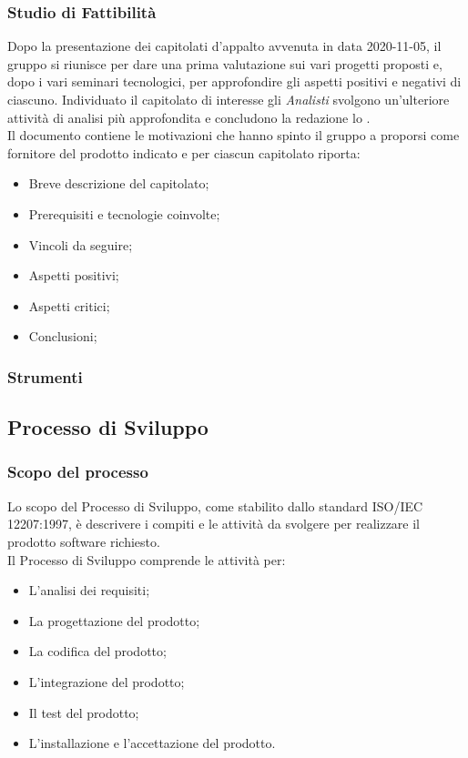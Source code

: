 \subsubsection{Studio di Fattibilità}
Dopo la presentazione dei capitolati d'appalto avvenuta in data 2020-11-05, il gruppo si riunisce per dare una prima valutazione sui vari progetti proposti e, dopo i vari seminari tecnologici, per approfondire gli aspetti positivi e negativi di ciascuno. Individuato il capitolato di interesse gli \textit{Analisti} svolgono un'ulteriore attività di analisi più approfondita e concludono la redazione lo \SdF. \\
Il documento contiene le motivazioni che hanno spinto il gruppo a proporsi come fornitore del prodotto indicato e per ciascun capitolato riporta:
\begin{itemize}
\item Breve descrizione del capitolato;
\item Prerequisiti e tecnologie coinvolte;
\item Vincoli da seguire;
\item Aspetti positivi;
\item Aspetti critici;
\item Conclusioni;
\end{itemize}

\subsubsection{Strumenti}

\newpage

\subsection{Processo di Sviluppo}
\subsubsection{Scopo del processo}
Lo scopo del Processo di Sviluppo, come stabilito dallo standard ISO/IEC 12207:1997, è descrivere i compiti e le attività da svolgere per realizzare il prodotto software richiesto. \\
Il Processo di Sviluppo comprende le attività per:
\begin{itemize}
	\item L'analisi dei requisiti;
	\item La progettazione del prodotto;
	\item La codifica del prodotto;
	\item L'integrazione del prodotto;
	\item Il test del prodotto;
	\item L'installazione e l'accettazione del prodotto.
\end{itemize}

